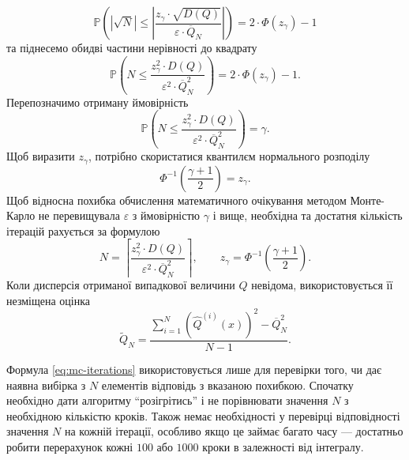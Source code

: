 \begin{equation*}
  \mathbb{P}\left(
    \left|
      \sqrt{N}
    \right|
    \le \left|
      \frac{z_{\gamma} \cdot \sqrt{D\left( Q \right)}}
      {\varepsilon \cdot \overline{Q}_N} \right|
  \right)
  = 2 \cdot \Phi\left( z_{\gamma} \right) - 1
\end{equation*}
та піднесемо обидві частини нерівності до квадрату
\begin{equation*}
  \mathbb{P}\left(
    N
    \le \frac{z^2_{\gamma} \cdot D\left( Q \right)}
      {\varepsilon^2 \cdot \overline{Q}_N^2}
  \right)
  = 2 \cdot \Phi\left( z_{\gamma} \right) - 1.
\end{equation*}
Перепозначимо отриману ймовірність
\begin{equation*}
  \mathbb{P}\left(
    N
    \le \frac{z^2_{\gamma} \cdot D\left( Q \right)}
      {\varepsilon^2 \cdot \overline{Q}_N^2}
  \right)
  = \gamma.
\end{equation*}
Щоб виразити $z_{\gamma}$,
потрібно скористатися квантилєм нормального розподілу
\begin{equation*}
  \Phi^{-1}\left( \frac{\gamma + 1}{2} \right) = z_{\gamma}.
\end{equation*}
Щоб відносна похибка обчислення математичного очікування методом Монте-Карло
не перевищувала $\varepsilon$ з ймовірністю $\gamma$ і вище,
необхідна та достатня кількість ітерацій рахується за формулою
\begin{equation}\label{eq:mc-iterations}
    N
    = \left\lceil \frac{z^2_{\gamma} \cdot D\left( Q \right)}
      {\varepsilon^2 \cdot \overline{Q}_N^2} \right\rceil, \qquad
    z_{\gamma} = \Phi^{-1}\left( \frac{\gamma + 1}{2} \right).
\end{equation}
Коли дисперсія отриманої випадкової величини $Q$ невідома,
використовується її незміщена оцінка
\begin{equation*}
  \widetilde{Q}_N
  = \frac{
    \sum\limits_{i=1}^{N}
      \left( \hat{Q}^{\left( i \right)}\left( x \right) \right)^2
    - \overline{Q}_N^2}{N - 1}.
\end{equation*}

Формула \eqref{eq:mc-iterations} використовується лише для перевірки того,
чи дає наявна вибірка з $N$ елементів відповідь з вказаною похибкою.
Спочатку необхідно дати алгоритму ``розігрітись'' і не порівнювати значення $N$
з необхідною кількістю кроків.
Також немає необхідності у перевірці відповідності значення $N$
на кожній ітерації,
особливо якщо це займає багато часу ---
достатньо робити перерахунок кожні $100$ або $1000$ кроки в залежності від
інтегралу.

